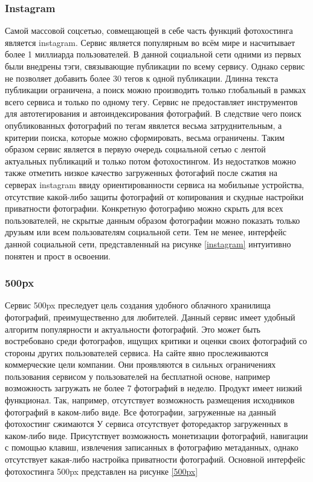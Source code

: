 \subsubsection{Instagram}
Самой массовой соцсетью, совмещающей в себе часть функций фотохостинга является instagram.
Сервис является популярным во всём мире и насчитывает более 1 миллиарда пользователей.
В данной социальной сети одними из первых были внедрены тэги, связывающие публикации по всему сервису.
Однако сервис не позволяет добавить более 30 тегов к одной публикации. 
Длинна текста публикации ограничена, а поиск можно производить только глобальный в рамках всего сервиса и только по одному тегу.
Сервис не предоставляет инструментов для автотегирования и автоиндексирования фотографий.
В следствие чего поиск опубликованных фотографий по тегам явялется весьма затруднительным, а критерии поиска, которые можно сформировать, весьма ограничены. 
Таким образом сервис является в первую очередь социальной сетью с лентой актуальных публикаций и только потом фотохостингом.
Из недостатков можно также отметить низкое качество загруженных фотогафий после сжатия на серверах instagram ввиду ориентированности сервиса на мобильные устройства, отсутствие какой-либо защиты фотографий от копирования и скудные настройки приватности фотографии.
Конкретную фотографию можно скрыть для всех пользователей, не скрытые данным образом фотографии можно показать только друзьям или всем пользователям социальной сети.
Тем не менее, интерфейс данной социальной сети, представленный на рисунке \ref{instagram} интуитивно понятен и прост в освоении.

\subsubsection{500px}
Сервис 500px преследует цель создания удобного облачного хранилища фотографий, преимущественно для любителей.
Данный сервис имеет удобный алгоритм популярности и актуальности фотографий.
Это может быть востребовано среди фотографов, ищущих критики и оценки своих фотографий со стороны других пользователей сервиса.
На сайте явно прослеживаются коммерческие цели компании.
Они проявляются в сильных ограничениях пользования сервисом у пользователей на бесплатной основе, например возможность загружать не более 7 фотографий в неделю.
Продукт имеет низкий функционал.
Так, например, отсутствует возможность размещения исходников фотографий в каком-либо виде.
Все фотографии, загруженные на данный фотохостинг сжимаются
У сервиса отсутствует фоторедактор загруженных в каком-либо виде.
Присутствует возможность монетизации фотографий, навигации с помощью клавиш, извлечения записанных в фотографию метаданных, однако отсутствует какая-либо настройка приватности фотографий.
Основной интерфейс фотохостинга 500px представлен на рисунке \ref{500px}

